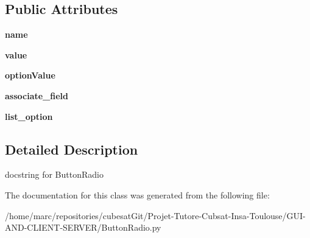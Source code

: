 \subsection*{Public Attributes}
\begin{DoxyCompactItemize}
\item 
\hypertarget{classButtonRadio_1_1ButtonRadio_a4cce572fb565cf1fa9c9172847a3f39c}{{\bfseries name}}\label{classButtonRadio_1_1ButtonRadio_a4cce572fb565cf1fa9c9172847a3f39c}

\item 
\hypertarget{classButtonRadio_1_1ButtonRadio_a37ae8eab733e072a949ba12e630d5047}{{\bfseries value}}\label{classButtonRadio_1_1ButtonRadio_a37ae8eab733e072a949ba12e630d5047}

\item 
\hypertarget{classButtonRadio_1_1ButtonRadio_ab597b88752502276037f7596350e551d}{{\bfseries option\+Value}}\label{classButtonRadio_1_1ButtonRadio_ab597b88752502276037f7596350e551d}

\item 
\hypertarget{classButtonRadio_1_1ButtonRadio_aa0b53898bca168d830ee8736818bbc10}{{\bfseries associate\+\_\+field}}\label{classButtonRadio_1_1ButtonRadio_aa0b53898bca168d830ee8736818bbc10}

\item 
\hypertarget{classButtonRadio_1_1ButtonRadio_a92992b469f6a513b17e566d53823acf8}{{\bfseries list\+\_\+option}}\label{classButtonRadio_1_1ButtonRadio_a92992b469f6a513b17e566d53823acf8}

\end{DoxyCompactItemize}


\subsection{Detailed Description}
\begin{DoxyVerb}docstring for ButtonRadio\end{DoxyVerb}
 

The documentation for this class was generated from the following file\+:\begin{DoxyCompactItemize}
\item 
/home/marc/repositories/cubesat\+Git/\+Projet-\/\+Tutore-\/\+Cubsat-\/\+Insa-\/\+Toulouse/\+G\+U\+I-\/\+A\+N\+D-\/\+C\+L\+I\+E\+N\+T-\/\+S\+E\+R\+V\+E\+R/Button\+Radio.\+py\end{DoxyCompactItemize}
